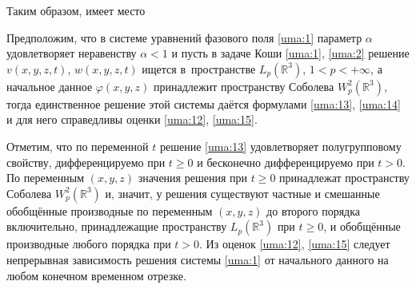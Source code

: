 
Таким образом, имеет место


\begin{theorem} Предположим, что в системе уравнений фазового поля \eqref{uma:1} параметр $\alpha$  удовлетворяет неравенству   $\alpha<1$ и пусть в задаче Коши \eqref{uma:1}{\rm ,} \eqref{uma:2} решение $v(x,y,z,t)${\rm ,} $w(x,y,z,t)$ ищется в~пространстве  $L_p(\mathbb R^3)${\rm ,}  $1<p<+\infty${\rm ,} а начальное данное  $\varphi(x,y,z)$ принадлежит пространству Соболева  $W_p^2(\mathbb R^3)${\rm ,} тогда единственное решение этой системы даётся формулами \eqref{uma:13}{\rm ,} \eqref{uma:14} и для него справедливы оценки \eqref{uma:12}{\rm ,} \eqref{uma:15}.
\end{theorem}


\begin{remark} Отметим, что по переменной $t$ решение \eqref{uma:13} удовлетворяет полугрупповому свойству, дифференцируемо при  $t\geq 0$ и бесконечно дифференцируемо при  $t>0$. По переменным  $(x,y,z)$ значения решения при $t\geq 0$  принадлежат пространству Соболева $W_p^2(\mathbb R^3)$  и, значит, у решения существуют частные и смешанные обобщённые производные по переменным $(x,y,z)$  до второго порядка включительно, принадлежащие пространству $L_p(\mathbb R^3)$  при  $t\geq 0$, и обобщённые производные любого порядка при  $t>0$. Из оценок \eqref{uma:12}, \eqref{uma:15} следует непрерывная зависимость решения системы \eqref{uma:1} от начального данного на любом конечном временном отрезке.
\end{remark}




